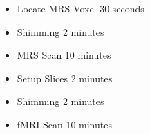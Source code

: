 \documentclass[10pt,a4paper]{scanner_protocol}
\begin{document}
\begin{itemize}
	\item Locate MRS Voxel \hfill 30 seconds
	\item Shimming \hfill 2 minutes
	\item MRS Scan \hfill 10 minutes
\end{itemize}
\divider

\begin{itemize}
    \item Setup Slices \hfill 2 minutes
	\item Shimming \hfill 2 minutes
	\item fMRI Scan \hfill 10 minutes
\end{itemize}
\divider
\divider

\clearpage







\end{document}
